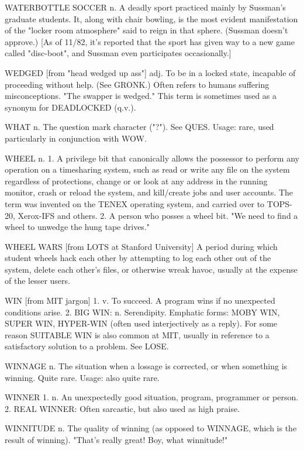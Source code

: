 WATERBOTTLE SOCCER n. A deadly sport practiced mainly by Sussman's
   graduate students.  It, along with chair bowling, is the most
   evident manifestation of the "locker room atmosphere" said to
   reign in that sphere.  (Sussman doesn't approve.)  [As of 11/82,
   it's reported that the sport has given way to a new game called
   "disc-boot", and Sussman even participates occasionally.]

WEDGED [from "head wedged up ass"] adj. To be in a locked state,
   incapable of proceeding without help.  (See GRONK.)	Often refers
   to humans suffering misconceptions.	"The swapper is wedged."
   This term is sometimes used as a synonym for DEADLOCKED (q.v.).

WHAT n. The question mark character ("?").  See QUES.  Usage: rare,
   used particularly in conjunction with WOW.

WHEEL n. 1. A privilege bit that canonically allows the possessor to
   perform any operation on a timesharing system, such as read or
   write any file on the system regardless of protections, change or
   or look at any address in the running monitor, crash or reload the
   system, and kill/create jobs and user accounts.  The term was
   invented on the TENEX operating system, and carried over to
   TOPS-20, Xerox-IFS and others.  2. A person who posses a wheel bit.
   "We need to find a wheel to unwedge the hung tape drives."

WHEEL WARS [from LOTS at Stanford University] A period during which
   student wheels hack each other by attempting to log each other out
   of the system, delete each other's files, or otherwise wreak havoc,
   usually at the expense of the lesser users.

WIN [from MIT jargon] 1. v. To succeed.	 A program wins if no
   unexpected conditions arise.	 2. BIG WIN: n. Serendipity.
   Emphatic forms: MOBY WIN, SUPER WIN, HYPER-WIN (often used
   interjectively as a reply).	For some reason SUITABLE WIN is also
   common at MIT, usually in reference to a satisfactory solution to a
   problem.  See LOSE.

WINNAGE n. The situation when a lossage is corrected, or when
   something is winning.  Quite rare.  Usage: also quite rare.

WINNER 1. n. An unexpectedly good situation, program, programmer or
   person.  2. REAL WINNER: Often sarcastic, but also used as high
   praise.

WINNITUDE n. The quality of winning (as opposed to WINNAGE, which is
   the result of winning).  "That's really great!  Boy, what
   winnitude!"

